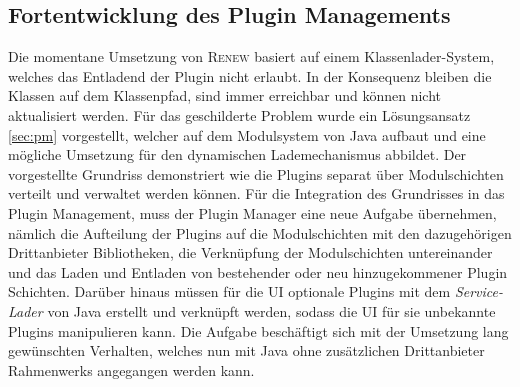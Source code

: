  \subsection*{Fortentwicklung des Plugin Managements}
	Die momentane Umsetzung von \textsc{Renew} basiert auf einem Klassenlader-System, welches das Entladend der Plugin nicht erlaubt. In der Konsequenz bleiben die Klassen auf dem Klassenpfad, sind immer erreichbar und können nicht aktualisiert werden. Für das geschilderte Problem wurde ein Lösungsansatz \ref{sec:pm} vorgestellt, welcher auf dem Modulsystem von Java aufbaut und eine mögliche Umsetzung für den dynamischen Lademechanismus abbildet. Der vorgestellte Grundriss demonstriert wie die Plugins separat über Modulschichten verteilt und verwaltet werden können.\newline
	Für die Integration des Grundrisses in das Plugin Management, muss der Plugin Manager eine neue Aufgabe übernehmen, nämlich die Aufteilung der Plugins auf die Modulschichten mit den dazugehörigen Drittanbieter Bibliotheken, die Verknüpfung der Modulschichten untereinander und das Laden und Entladen von bestehender oder neu hinzugekommener Plugin Schichten. Darüber hinaus müssen für die UI optionale Plugins mit dem \textit{Service-Lader} von Java erstellt und verknüpft werden, sodass die UI für sie unbekannte Plugins manipulieren kann. \newline
	Die Aufgabe beschäftigt sich mit der Umsetzung lang gewünschten Verhalten, welches nun mit Java ohne zusätzlichen Drittanbieter Rahmenwerks angegangen werden kann. 




